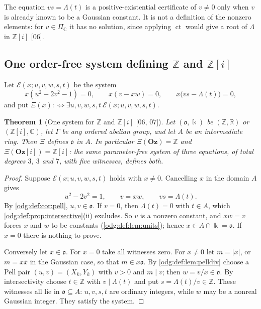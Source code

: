 \documentclass[11pt,oneside]{article}
\numberwithin{equation}{section}
\newtheorem{theorem}{Theorem}[section]
\theoremstyle{definition}
\theoremstyle{remark}
\newcommand{\Oz}{\mathbf{Oz}}
\newcommand{\Z}{\mathbb Z}
\newcommand{\R}{\mathbb R}
\newcommand{\C}{\mathbb C}
\newcommand{\ct}{\operatorname{ct}}
\newcommand{\src}[1]{\textup{\textsf{\small[#1]}}}
\newcommand{\Og}{\Oz[i]}
\begin{document}
The equation $vs=\Lambda(t)$ is a positive-existential certificate of
$v\ne0$ only when $v$ is already known to be a Gaussian constant. It is not a
definition of the nonzero elements: for $v\in\Pi_{\C}$ it has no solution,
since applying $\ct$ would give a root of $\Lambda$ in $\Z[i]$ \src{06}.

\subsection{One order-free system defining \texorpdfstring{$\Z$}{Z} and \texorpdfstring{$\Z[i]$}{Z[i]}}

Let $\mathcal E(x;u,v,w,s,t)$ be the system
\begin{equation}\label{odg:def:eq:system}
 x(u^2-2v^2-1)=0,\qquad x(v-xw)=0,\qquad x\bigl(vs-\Lambda(t)\bigr)=0,
\end{equation}
and put $\Xi(x):\Leftrightarrow\exists u,v,w,s,t\ \mathcal E(x;u,v,w,s,t)$.

\begin{theorem}[{One system for $\Z$ and $\Z[i]$} \src{06, 07}]\label{odg:def:thm:constants}
Let $(\mathfrak o,\Bbbk)$ be $(\Z,\R)$ or $(\Z[i],\C)$, let $\Gamma$ be any
ordered abelian group, and let $A$ be an intermediate ring. Then $\Xi$ defines
$\mathfrak o$ in $A$. In particular $\Xi(\Oz)=\Z$ and $\Xi(\Og)=\Z[i]$: the same
parameter-free system of three equations, of total degrees $3$, $3$ and $7$,
with five witnesses, defines both.
\end{theorem}
\begin{proof}
Suppose $\mathcal E(x;u,v,w,s,t)$ holds with $x\ne0$. Cancelling $x$ in the
domain $A$ gives
\[
 u^2-2v^2=1,\qquad v=xw,\qquad vs=\Lambda(t).
\]
By \cref{odg:def:cor:pell}, $u,v\in\mathfrak o$. If $v=0$, then $\Lambda(t)=0$
with $t\in A$, which \cref{odg:def:prop:intersective}(ii) excludes. So $v$ is a
nonzero constant, and $xw=v$ forces $x$ and $w$ to be constants
(\cref{odg:def:lem:units}); hence $x\in A\cap\Bbbk=\mathfrak o$. If $x=0$ there
is nothing to prove.

Conversely let $x\in\mathfrak o$. For $x=0$ take all witnesses zero. For
$x\ne0$ let $m=|x|$, or $m=x\overline x$ in the Gaussian case, so that
$m\in x\mathfrak o$. By \cref{odg:def:lem:pelldiv} choose a Pell pair
$(u,v)=(X_k,Y_k)$ with $v>0$ and $m\mid v$; then $w=v/x\in\mathfrak o$. By
intersectivity choose $t\in\Z$ with $v\mid\Lambda(t)$ and put
$s=\Lambda(t)/v\in\Z$. These witnesses all lie in $\mathfrak o\subseteq A$: $u,v,s,t$ are
ordinary integers, while $w$ may be a nonreal Gaussian integer. They
satisfy the system.
\end{proof}
\end{document}
